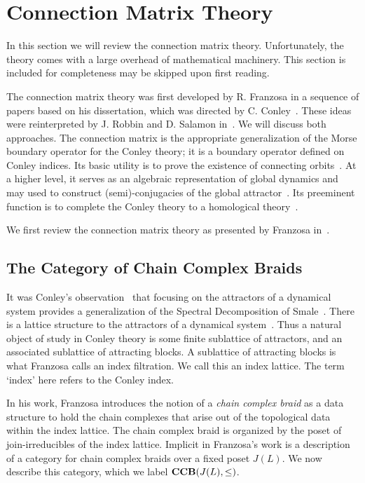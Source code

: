 
\section{Connection Matrix Theory}\label{sec:CMT}

In this section we will review the connection matrix theory.  Unfortunately, the theory comes with a large overhead of mathematical machinery.  This section is included for completeness may be skipped upon first reading.

The connection matrix theory was first developed by R. Franzosa in a sequence of papers based on his dissertation, which was directed by C. Conley~\cite{fran2,fran,fran3}.  These ideas were reinterpreted by J. Robbin and D. Salamon in~\cite{salamon}.  We will discuss both approaches.  The connection matrix is the appropriate generalization of the Morse boundary operator for the Conley theory; it is a boundary operator defined on Conley indices.  Its basic utility is to prove the existence of connecting orbits~\cite{mpmw}.  At a higher level, it serves as an algebraic representation of global dynamics and may used to construct (semi)-conjugacies of the global attractor~\cite{dhmo,mcmodels,scalar}. Its preeminent function is to complete the Conley theory to a homological theory~\cite{mc}.  

We first review the connection matrix theory as presented by Franzosa in~\cite{fran}.

\subsection{The Category of Chain Complex Braids}
It was Conley's observation~\cite{conley} that focusing on the attractors of a dynamical system provides a generalization of the Spectral Decomposition of Smale~\cite[Theorem 6.2]{smale}.  There is a lattice structure to the attractors of a dynamical system~\cite{salamon,lsa,lsa2}.  Thus a natural object of study in Conley theory is some finite sublattice of attractors, and an associated sublattice of attracting blocks.  A sublattice of attracting blocks is what Franzosa calls an index filtration.  We call this an index lattice. The term `index' here refers to the Conley index.

In his work, Franzosa introduces the notion of a {\em chain complex braid} as a data structure to hold the chain complexes that arise out of the topological data within the index lattice.  The chain complex braid is organized by the poset of join-irreducibles of the index lattice.  Implicit in Franzosa's work is a description of a category for chain complex braids over a fixed poset $J(L)$.  We now describe this category, which we label ${\bf CCB}(J(L),\leq)$.

